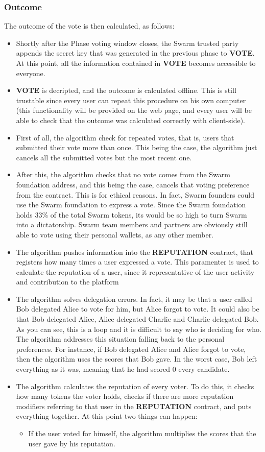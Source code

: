 \documentclass[submission, copyright,creativecommons,sharealike,noncommercial]{eptcs}
\newcommand{\Vote}{\textbf{VOTE}\xspace}
\newcommand{\Reputation}{\textbf{REPUTATION}\xspace}
\begin{document}
\subsubsection{Outcome}
%
		The outcome of the vote is then calculated, as follows:
		\begin{itemize}	
			\item Shortly after the Phase voting window closes, the Swarm trusted party appends the secret key that was generated in the previous phase to \Vote. At this point, all the information contained in \Vote becomes accessible to everyone.
			\item \Vote is decripted, and the outcome is calculated offline. This is still trustable since every user can repeat this procedure on his own computer (this functionality will be provided on the web page, and every user will be able to check that the outcome was calculated correctly with client-side).
			\item First of all, the algorithm check for repeated votes, that is, users that submitted their vote more than once. This being the case, the algorithm just cancels all the submitted votes but the most recent one.
			\item After this, the algorithm checks that no vote comes from the Swarm foundation address, and this being the case, cancels that voting preference from the contract. This is for ethical reasons. In fact, Swarm founders could use the Swarm foundation to express a vote. Since the Swarm foundation holds 33\% of the total Swarm tokens, its would be so high to turn Swarm into a dictatorship. Swarm team members and partners are obviously still able to vote using their personal wallets, as any other member.
			\item The algorithm pushes information into the \Reputation contract, that registers how many times a user expressed a vote. This paramenter is used to calculate the reputation of a user, since it representative of the user activity and contribution to the platform
			\item The algorithm solves delegation errors. In fact, it may be that a user called Bob delegated Alice to vote for him, but Alice forgot to vote. It could also be that Bob delegated Alice, Alice delegated Charlie and Charlie delegated Bob. As you can see, this is a loop and it is difficult to say who is deciding for who. The algorithm addresses this situation falling back to the personal preferences. For instance, if Bob delegated Alice and Alice forgot to vote, then the algorithm uses the scores that Bob gave. In the worst case, Bob left everything as it was, meaning that he had scored $0$ every candidate.
			\item The algorithm calculates the reputation of every voter. To do this, it checks how many tokens the voter holds, checks if there are more reputation modifiers referring to that user in the \Reputation contract, and puts everything together. At this point two things can happen:
			\begin{itemize}
				\item If the user voted for himself, the algorithm multiplies the scores that the user gave by his reputation.
				

\end{itemize}
\end{itemize}
\end{document}

